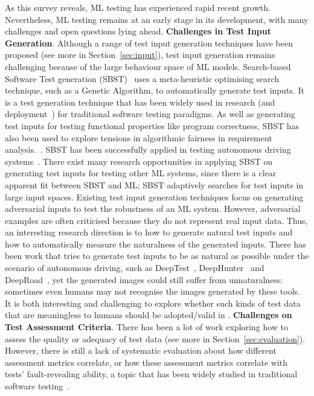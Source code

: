 \label{sec:challenges}
As this survey reveals, ML testing has experienced rapid recent growth.
Nevertheless, ML testing remains at an early stage in its development, with many challenges and open questions lying ahead.
\noindent\textbf{Challenges in Test Input Generation}.
Although a range of test input generation techniques have been proposed (see more in Section~\ref{sec:input}), test input generation remains  challenging because of the large behaviour space of ML models. 
Search-based Software Test generation (SBST)~ uses a meta-heuristic optimising search technique, such as a Genetic Algorithm, to automatically generate test inputs.
It is a test generation technique that has been widely used in research (and deployment~) for traditional software testing paradigms.
As well as generating test inputs for testing functional properties like program correctness, SBST has also been used to explore tensions in algorithmic fairness in requirement analysis.~.
SBST has been successfully applied in testing autonomous driving systems~.
There exist many research opportunities in applying SBST on generating test inputs for testing other ML systems, since there is a clear apparent fit between SBST and ML; SBST adaptively searches for test inputs in large input spaces.
Existing test input generation techniques focus on generating adversarial inputs to test the robustness of an ML system.
However, adversarial examples are often criticised because they do not represent real input data.
Thus, an interesting research direction is to how to generate natural test inputs and how to automatically measure the naturalness of the generated inputs. 
There has been work that tries to generate test inputs to be as natural as possible under the scenario of autonomous driving, such as DeepTest~, DeepHunter~ and DeepRoad~, yet the generated images could still suffer from unnaturalness: sometimes even humans may not recognise the images generated by these tools.
It is both interesting and challenging to explore whether such kinds of test data that are meaningless to humans should be adopted/valid in \mlt{}.
\noindent\textbf{Challenges on Test Assessment Criteria}.
There has been a lot of work exploring how to assess the quality or adequacy of test data (see more in Section~\ref{sec:evaluation}).
However, there is still a lack of systematic evaluation about how different assessment metrics correlate, or how these assessment metrics correlate with tests' fault-revealing ability, a topic that has been widely studied in traditional software testing~.
